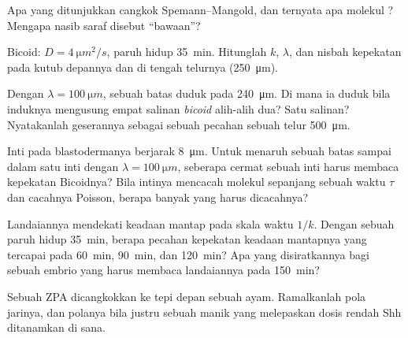 \begin{exercise}[$\star$]\label{exo:b3:developmental-genetics:4}
Apa yang ditunjukkan cangkok Spemann--Mangold, dan ternyata apa molekul
? Mengapa nasib saraf disebut ``bawaan''?
\end{exercise}

\begin{exercise}[$\star\star$]\label{exo:b3:developmental-genetics:5}
Bicoid: $D = \qty{4}{\micro m^2/s}$, paruh hidup \qty{35}{min}. Hitunglah
$k$, $\lambda$, dan nisbah kepekatan pada kutub depannya dan
di tengah telurnya (\qty{250}{\micro m}).
\end{exercise}

\begin{exercise}[$\star\star$]\label{exo:b3:developmental-genetics:6}
Dengan $\lambda = \qty{100}{\micro m}$, sebuah batas duduk pada
\qty{240}{\micro m}. Di mana ia duduk bila induknya mengusung empat salinan
\emph{bicoid} alih-alih dua? Satu salinan? Nyatakanlah geserannya sebagai sebuah
pecahan sebuah telur \qty{500}{\micro m}.
\end{exercise}

\begin{exercise}[$\star\star$]\label{exo:b3:developmental-genetics:7}
Inti pada blastodermanya berjarak \qty{8}{\micro m}. Untuk menaruh sebuah
batas sampai dalam satu inti dengan $\lambda = \qty{100}{\micro m}$,
seberapa cermat sebuah inti harus membaca kepekatan Bicoidnya? Bila
intinya mencacah molekul sepanjang sebuah waktu $\tau$ dan cacahnya Poisson,
berapa banyak yang harus dicacahnya?
\end{exercise}

\begin{exercise}[$\star\star$]\label{exo:b3:developmental-genetics:8}
Landaiannya mendekati keadaan mantap pada skala waktu $1/k$. Dengan sebuah
paruh hidup \qty{35}{min}, berapa pecahan kepekatan keadaan mantapnya
yang tercapai pada \qty{60}{min}, \qty{90}{min}, dan
\qty{120}{min}? Apa yang disiratkannya bagi sebuah embrio yang harus membaca
landaiannya pada \qty{150}{min}?
\end{exercise}

\begin{exercise}[$\star\star$]\label{exo:b3:developmental-genetics:9}
Sebuah ZPA dicangkokkan ke tepi depan sebuah  ayam. Ramalkanlah
pola jarinya, dan polanya bila justru sebuah manik yang melepaskan dosis rendah
Shh ditanamkan di sana.
\end{exercise}

